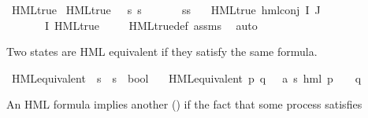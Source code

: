 \begin{isabellebody}
\isanewline
{}\isamarkupfalse%
\ HML{\isacharunderscore}{\kern0pt}true\ \isanewline
{\isachardoublequoteopen}HML{\isacharunderscore}{\kern0pt}true\ {\isasymphi}\ {\isasymequiv}\ {\isasymforall}s{\isachardot}{\kern0pt}\ s\ {\isasymTurnstile}\ {\isasymphi}{\isachardoublequoteclose}\isanewline
\isanewline
{}\isamarkupfalse%
\ \isanewline
\ \ \ s{\isacharcolon}{\kern0pt}{\isacharcolon}{\kern0pt}{\isacharprime}{\kern0pt}s\isanewline
\ \ \ {\isachardoublequoteopen}HML{\isacharunderscore}{\kern0pt}true\ {\isacharparenleft}{\kern0pt}hml{\isacharunderscore}{\kern0pt}conj\ I\ J\ {\isasymPhi}{\isacharparenright}{\kern0pt}{\isachardoublequoteclose}\isanewline
\ \ \ {\isachardoublequoteopen}{\isasymforall}{\isasymphi}\ {\isasymin}\ {\isasymPhi}\ {\isacharbackquote}{\kern0pt}\ I{\isachardot}{\kern0pt}\ HML{\isacharunderscore}{\kern0pt}true\ {\isasymphi}{\isachardoublequoteclose}\isanewline
%
\isadelimproof
\ \ %
\endisadelimproof
%
\isatagproof
{}\isamarkupfalse%
\ HML{\isacharunderscore}{\kern0pt}true{\isacharunderscore}{\kern0pt}def\ assms\ \isamarkupfalse%
\ auto%
\endisatagproof
{\isafoldproof}%
%
\isadelimproof
%
\endisadelimproof
%
\begin{isamarkuptext}%
Two states are HML equivalent if they satisfy the same formula.%
\end{isamarkuptext}\isamarkuptrue%
\isamarkupfalse%
\ HML{\isacharunderscore}{\kern0pt}equivalent\ {\isacharcolon}{\kern0pt}{\isacharcolon}{\kern0pt}\ {\isacartoucheopen}{\isacharprime}{\kern0pt}s\ {\isasymRightarrow}\ {\isacharprime}{\kern0pt}s\ {\isasymRightarrow}\ bool{\isacartoucheclose}\ \isanewline
\ \ {\isacartoucheopen}HML{\isacharunderscore}{\kern0pt}equivalent\ p\ q\ {\isasymequiv}\ {\isacharparenleft}{\kern0pt}{\isasymforall}\ {\isasymphi}{\isacharcolon}{\kern0pt}{\isacharcolon}{\kern0pt}{\isacharparenleft}{\kern0pt}{\isacharprime}{\kern0pt}a{\isacharcomma}{\kern0pt}\ {\isacharprime}{\kern0pt}s{\isacharparenright}{\kern0pt}\ hml{\isachardot}{\kern0pt}\ {\isacharparenleft}{\kern0pt}p\ {\isasymTurnstile}\ {\isasymphi}{\isacharparenright}{\kern0pt}\ {\isasymlongleftrightarrow}\ {\isacharparenleft}{\kern0pt}q\ {\isasymTurnstile}\ {\isasymphi}{\isacharparenright}{\kern0pt}{\isacharparenright}{\kern0pt}{\isacartoucheclose}%
\begin{isamarkuptext}%
An HML formula  implies another () if the fact that some process  satisfies 

\end{isamarkuptext}
\end{isabellebody}
